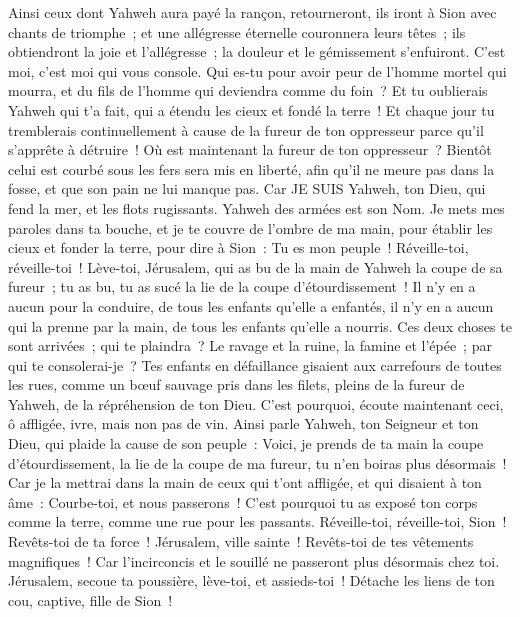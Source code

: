 \begin{multicols}{2}
Ainsi ceux dont Yahweh aura payé la rançon, retourneront, ils iront à Sion avec chants de triomphe~; et une allégresse éternelle couronnera leurs têtes~; ils obtiendront la joie et l'allégresse~; la douleur et le gémissement s'enfuiront.
C'est moi, c'est moi qui vous console. Qui es-tu pour avoir peur de l'homme mortel qui mourra, et du fils de l'homme qui deviendra comme du foin~?
Et tu oublierais Yahweh qui t'a fait, qui a étendu les cieux et fondé la terre~! Et chaque jour tu tremblerais continuellement à cause de la fureur de ton oppresseur parce qu'il s'apprête à détruire~! Où est maintenant la fureur de ton oppresseur~?
Bientôt celui est courbé sous les fers sera mis en liberté, afin qu'il ne meure pas dans la fosse, et que son pain ne lui manque pas.
Car JE SUIS Yahweh, ton Dieu, qui fend la mer, et les flots rugissants. Yahweh des armées est son Nom.
Je mets mes paroles dans ta bouche, et je te couvre de l'ombre de ma main, pour établir les cieux et fonder la terre, pour dire à Sion~: Tu es mon peuple~!
Réveille-toi, réveille-toi~! Lève-toi, Jérusalem, qui as bu de la main de Yahweh la coupe de sa fureur~; tu as bu, tu as sucé la lie de la coupe d'étourdissement~!
Il n'y en a aucun pour la conduire, de tous les enfants qu'elle a enfantés, il n'y en a aucun qui la prenne par la main, de tous les enfants qu'elle a nourris.
Ces deux choses te sont arrivées~; qui te plaindra~? Le ravage et la ruine, la famine et l'épée~; par qui te consolerai-je~?
Tes enfants en défaillance gisaient aux carrefours de toutes les rues, comme un bœuf sauvage pris dans les filets, pleins de la fureur de Yahweh, de la répréhension de ton Dieu.
C'est pourquoi, écoute maintenant ceci, ô affligée, ivre, mais non pas de vin.
Ainsi parle Yahweh, ton Seigneur et ton Dieu, qui plaide la cause de son peuple~: Voici, je prends de ta main la coupe d'étourdissement, la lie de la coupe de ma fureur, tu n'en boiras plus désormais~!
Car je la mettrai dans la main de ceux qui t'ont affligée, et qui disaient à ton âme~: Courbe-toi, et nous passerons~! C'est pourquoi tu as exposé ton corps comme la terre, comme une rue pour les passants.
\VerseOne{}Réveille-toi, réveille-toi, Sion~! Revêts-toi de ta force~! Jérusalem, ville sainte~! Revêts-toi de tes vêtements magnifiques~! Car l'incirconcis et le souillé ne passeront plus désormais chez toi.
Jérusalem, secoue ta poussière, lève-toi, et assieds-toi~! Détache les liens de ton cou, captive, fille de Sion~!

\end{multicols}
